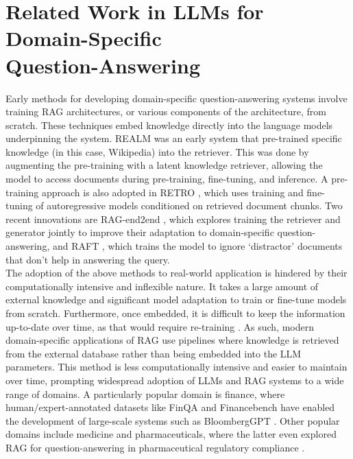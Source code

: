 \section{Related Work in LLMs for Domain-Specific \\Question-Answering}

Early methods for developing domain-specific question-answering systems involve training RAG architectures, or various components of the architecture, from scratch. These techniques embed knowledge directly into the language models underpinning the system. REALM \cite{guu2020realm} was an early system that pre-trained specific knowledge (in this case, Wikipedia) into the retriever. This was done by augmenting the pre-training with a latent knowledge retriever, allowing the model to access documents during pre-training, fine-tuning, and inference. A pre-training approach is also adopted in RETRO \cite{borgeaud2022improvinglanguagemodelsretrieving}, which uses training and fine-tuning of autoregressive models conditioned on retrieved document chunks. Two recent innovations are RAG-end2end \cite{siriwardhana2022improvingdomainadaptationretrieval}, which explores training the retriever and generator jointly to improve their adaptation to domain-specific question-answering, and RAFT \cite{zhang2024raftadaptinglanguagemodel}, which trains the model to ignore `distractor' documents that don't help in answering the query. \\


The adoption of the above methods to real-world application is hindered by their computationally intensive and inflexible nature. It takes a large amount of external knowledge and significant model adaptation to train or fine-tune models from scratch. Furthermore, once embedded, it is difficult to keep the information up-to-date over time, as that would require re-training \cite{gao2024retrievalaugmented}. As such, modern domain-specific applications of RAG use pipelines where knowledge is retrieved from the external database rather than being embedded into the LLM parameters. This method is less computationally intensive and easier to maintain over time, prompting widespread adoption of LLMs and RAG systems to a wide range of domains. A particularly popular domain is finance, where human/expert-annotated datasets like FinQA \cite{chen2022finqa} and Financebench \cite{islam2023financebench} have enabled the development of large-scale systems such as BloombergGPT \cite{wu2023bloomberggptlargelanguagemodel}. Other popular domains include medicine \cite{xiong2024benchmarkingretrievalaugmentedgenerationmedicine} and pharmaceuticals, where the latter even explored RAG for question-answering in pharmaceutical regulatory compliance \cite{kim2024ragqaragintegratinggenerative}. \\


